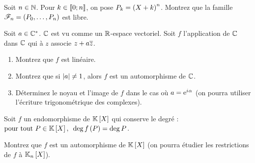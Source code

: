 \begin{corr}
\end{corr}

\begin{exopss}[Exercice 4]
Soit \(n\in\mathbb{N}\). Pour \(k\in\left\llbracket0;n\right\rrbracket\), on pose \(P_k=\left(X+k\right)^n\). Montrez que la famille \(\mathscr{F}_n=\left(P_0,\dots,P_n\right)\) est libre.
\end{exopss}

\begin{corr}
\end{corr}

\begin{exos}[Exercice 5]
Soit \(a\in\mathbb{C}^*\). \(\mathbb{C}\) est vu comme un \(\mathbb{R}\)-espace vectoriel. Soit \(f\) l'application de \(\mathbb{C}\) dans \(\mathbb{C}\) qui à \(z\) associe \(z+a\overline{z}\).

\begin{enumerate}
    \item Montrez que \(f\) est linéaire. \\
    \item Montrez que si \(\left\lvert a\right\rvert\not=1\), alors \(f\) est un automorphisme de \(\mathbb{C}\). \\
    \item Déterminez le noyau et l'image de \(f\) dans le cas où \(a=\mathrm{e}^{i\mkern1mu\alpha}\) (on pourra utiliser l'écriture trigonométrique des complexes).
\end{enumerate}
\end{exos}

\begin{corr}
\end{corr}

\begin{exops}[Exercice 6]
Soit \(f\) un endomorphisme de \(\poly\) qui conserve le degré : \(\quantifs{\tpt P\in\poly}\deg f\paren{P}=\deg P\).

Montrez que \(f\) est un automorphisme de \(\poly\) (on pourra étudier les restrictions de \(f\) à \(\polydeg{n}\)).
\end{exops}

\begin{corr}
\end{corr}

